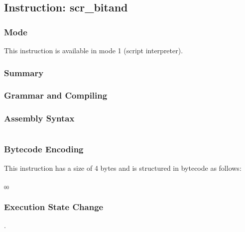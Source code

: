 \subsection{Instruction: scr\_bitand}

\subsubsection{Mode}
This instruction is available in mode 1 (script interpreter).
\subsubsection{Summary}


\subsubsection{Grammar and Compiling}


\subsubsection{Assembly Syntax}

\begin{myquote}
\begin{verbatim}

\end{verbatim}
\end{myquote}

\subsubsection{Bytecode Encoding}

This instruction has a size of 4 bytes and is structured in bytecode as follows:

$_{00}$\ 

\subsubsection{Execution State Change}

.


